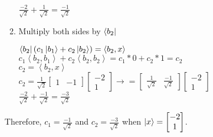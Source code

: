 \documentclass[12pt]{article}
\theoremstyle{plain}
\theoremstyle{nonumberplain}
\theoremstyle{plain}
\theoremstyle{nonumberplain}
\newcommand\1{{\bf 1}}
\newcommand{\bmat}[1]{\begin{bmatrix*} #1 \end{bmatrix*}} %
\newcommand{\<}{\left\langle}
\renewcommand{\>}{\right\rangle}
\newcommand{\inp}[2]{\left\langle#1, #2\right\rangle} %
\begin{document}
\begin{enumerate}[label=(\alph*)]
\begin{enumerate}[label=(\roman*)]
\begin{center}
		$\frac{-2}{\sqrt{2}}+\frac{1}{\sqrt{2}}=\frac{-1}{\sqrt{2}}$ \\
		\end{center}
		\item Multiply both sides by $\bra{b_2}$
		\begin{center}
		$\bra{b_2}(c_1\ket{b_1}+c_2\ket{b_2})=\inp{b_2}{x}$ \\
		$c_1\inp{b_2}{b_1}+c_2\inp{b_2}{b_2} = c_1*0+c_2*1=c_2$ \\
		$c_2=\inp{b_2}{x}$ \\
		
		$c_2=\frac{1}{\sqrt{2}}\bmat{1 & -1}\bmat{-2 \\ 1}\longrightarrow =\bmat{\frac{1}{\sqrt{2}} & \frac{-1}				{\sqrt{2}}}\bmat{-2 \\ 1}$ \\
		$\frac{-2}{\sqrt{2}}+\frac{-1}{\sqrt{2}}=\frac{-3}{\sqrt{2}}$ \\
		\end{center}
	\end{enumerate}
	Therefore, $c_1=\frac{-1}{\sqrt{2}}$ and $c_2=\frac{-3}{\sqrt{2}}$ when $\ket{x}=\bmat{-2 \\ 1}$.
\end{enumerate}

\end{document}
